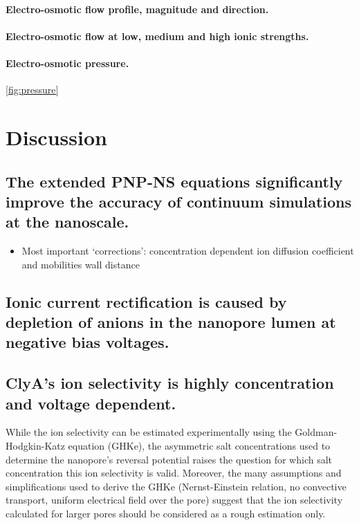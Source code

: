 \documentclass[journal=ancac3, manuscript=article, etalmode=truncate,maxauthors=0]{achemso}
\begin{document}
\paragraph{Electro-osmotic flow profile, magnitude and direction.}
\paragraph{Electro-osmotic flow at low, medium and high ionic strengths.}
\paragraph{Electro-osmotic pressure.}
\cref{fig:pressure}
\cite{hoogerheide2014}


\section{Discussion}\label{sect:discussion}

\subsection{The extended PNP-NS equations significantly improve the accuracy of continuum simulations at the 
nanoscale.}

\begin{itemize}
  \item Most important `corrections':
  \subitem concentration dependent ion diffusion coefficient and mobilities
  \subitem wall distance 
\end{itemize}

\subsection{Ionic current rectification is caused by depletion of anions in the nanopore lumen at negative 
bias voltages.}

\subsection{ClyA's ion selectivity is highly concentration and voltage dependent.}
While the ion selectivity can be estimated experimentally using the Goldman-Hodgkin-Katz 
equation (GHKe),\cite{franceschini2016,huang2017} the asymmetric salt concentrations used to determine the 
nanopore's reversal potential raises the question for which salt concentration this ion selectivity is valid.
Moreover, the many assumptions and simplifications used to derive the GHKe (Nernst-Einstein relation, no 
convective transport, uniform electrical field over the pore) suggest that the ion selectivity calculated for 
larger pores should be considered as a rough estimation only.
\end{document}
